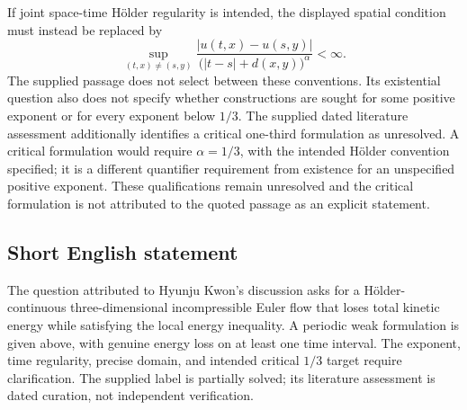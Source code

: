 \documentclass[11pt]{article}
\begin{document}
If joint space-time Hölder regularity is intended, the displayed spatial condition must instead be replaced by
\[
\sup_{(t,x)\ne(s,y)}
\frac{|u(t,x)-u(s,y)|}{\bigl(|t-s|+d(x,y)\bigr)^\alpha}<\infty.
\]
The supplied passage does not select between these conventions. Its existential question also does not specify whether constructions are sought for some positive exponent or for every exponent below \(1/3\). The supplied dated literature assessment additionally identifies a critical one-third formulation as unresolved. A critical formulation would require \(\alpha=1/3\), with the intended Hölder convention specified; it is a different quantifier requirement from existence for an unspecified positive exponent. These qualifications remain unresolved and the critical formulation is not attributed to the quoted passage as an explicit statement.
\subsection{Short English statement}
The question attributed to Hyunju Kwon's discussion asks for a Hölder-continuous three-dimensional incompressible Euler flow that loses total kinetic energy while satisfying the local energy inequality. A periodic weak formulation is given above, with genuine energy loss on at least one time interval. The exponent, time regularity, precise domain, and intended critical \(1/3\) target require clarification. The supplied label is partially solved; its literature assessment is dated curation, not independent verification.
\end{document}
